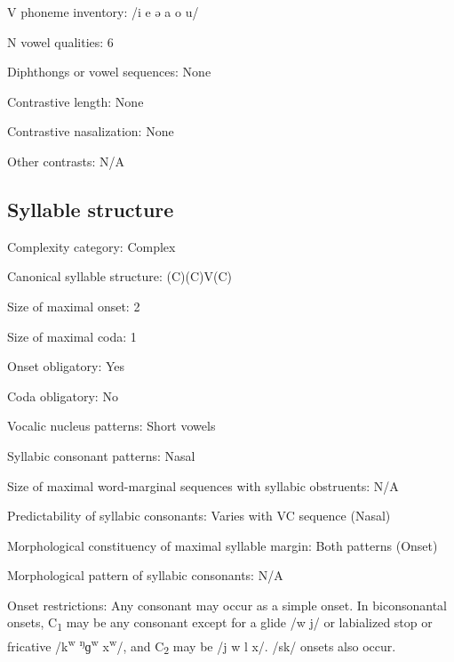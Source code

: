 {\begin{appendixdesc}
\item[V phoneme inventory:] /i e ə a o u/

\item[N vowel qualities:] 6

\item[Diphthongs or vowel sequences:] None

\item[Contrastive length:] None

\item[Contrastive nasalization:] None

\item[Other contrasts:] N/A
\end{appendixdesc}
\subsection*{Syllable structure}
\begin{appendixdesc}

\item[Complexity category:] Complex

\item[Canonical syllable structure:] (C)(C)V(C) \citep[63--73]{Loughnane2009}

\item[Size of maximal onset:] 2

\item[Size of maximal coda:] 1

\item[Onset obligatory:] Yes

\item[Coda obligatory:] No

\item[Vocalic nucleus patterns:] Short vowels

\item[Syllabic consonant patterns:] Nasal

\item[Size of maximal word-marginal sequences with syllabic obstruents:] N/A

\item[Predictability of syllabic consonants:] Varies with VC sequence (Nasal)

\item[Morphological constituency of maximal syllable margin:] Both patterns (Onset)

\item[Morphological pattern of syllabic consonants:] N/A

\item[Onset restrictions:] Any consonant may occur as a simple onset. In biconsonantal onsets, C\textsubscript{1} may be any consonant except for a glide /w j/ or labialized stop or fricative /k\textsuperscript{w} \textsuperscript{ŋ}ɡ\textsuperscript{w} x\textsuperscript{w}/, and C\textsubscript{2} may be /j w l x/. /sk/ onsets also occur.


\end{appendixdesc}}

